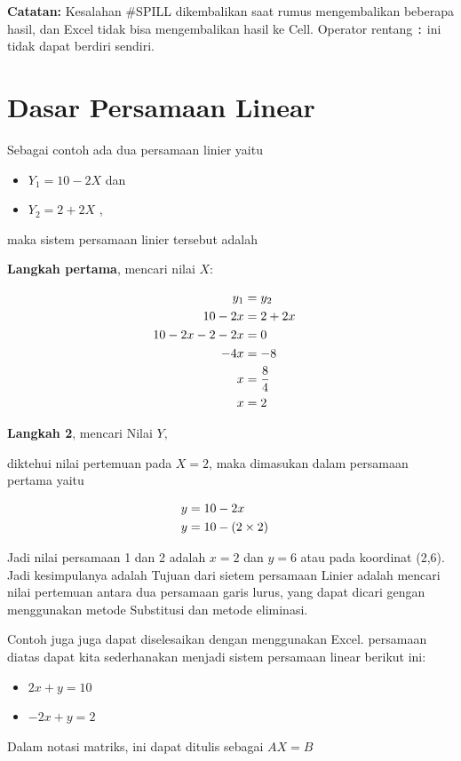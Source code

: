 \documentclass[
]{book}
\providecommand{\tightlist}{%
  \setlength{\itemsep}{0pt}\setlength{\parskip}{0pt}}
\begin{document}
\textbf{Catatan:} Kesalahan \#SPILL dikembalikan saat rumus mengembalikan beberapa hasil, dan Excel tidak bisa mengembalikan hasil ke Cell. Operator rentang \texttt{:} ini tidak dapat berdiri sendiri.

\hypertarget{dasar-persamaan-linear}{%
\section{Dasar Persamaan Linear}\label{dasar-persamaan-linear}}

Sebagai contoh ada dua persamaan linier yaitu

\begin{itemize}
\tightlist
\item
  \(Y_1 = 10 -2X\) dan
\item
  \(Y_2 = 2 + 2X\) ,
\end{itemize}

maka sistem persamaan linier tersebut adalah

\textbf{Langkah pertama}, mencari nilai \(X:\)

\[
\begin{aligned}
y_1   &= y_2 \cr
10-2x &= 2+2x \cr
10-2x-2-2x &= 0 \cr
-4x &= -8 \cr
x &= {8\over 4} \cr
x &= 2 
\end{aligned}
\]

\textbf{Langkah 2}, mencari Nilai \(Y,\)

diktehui nilai pertemuan pada \(X=2\), maka dimasukan dalam persamaan pertama yaitu

\[
\begin{aligned}
y &= 10-2x \cr
y &= 10-(2 \times 2)
\end{aligned}
\]

Jadi nilai persamaan 1 dan 2 adalah \(x=2\) dan \(y=6\) atau pada koordinat (2,6). Jadi kesimpulanya adalah Tujuan dari sietem persamaan Linier adalah mencari nilai pertemuan antara dua persamaan garis lurus, yang dapat dicari gengan menggunakan metode Substitusi dan metode eliminasi.

Contoh juga juga dapat diselesaikan dengan menggunakan Excel. persamaan diatas dapat kita sederhanakan menjadi sistem persamaan linear berikut ini:

\begin{itemize}
\tightlist
\item
  \(2x + y = 10\)
\item
  \(-2x +y = 2\)
\end{itemize}

Dalam notasi matriks, ini dapat ditulis sebagai \(AX = B\)
\end{document}
